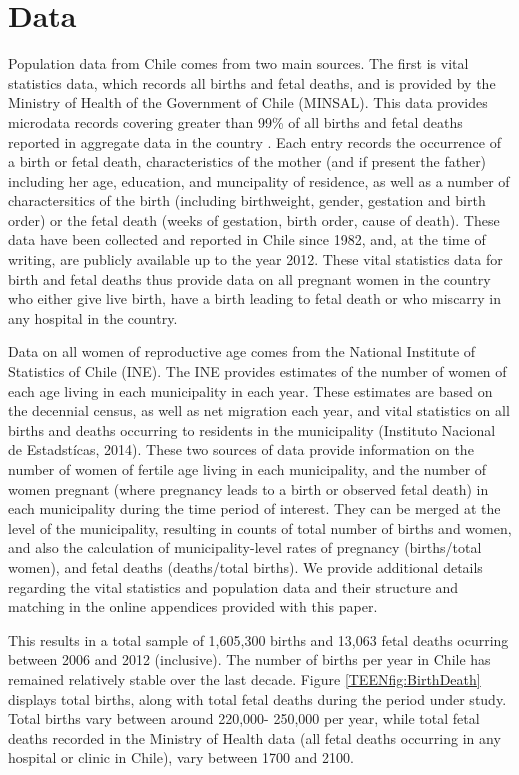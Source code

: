 \section{Data}
\label{TEENscn:Data}
Population data from Chile comes from two main sources. The first is vital 
statistics data, which records all births and fetal deaths, and is provided by 
the Ministry of Health of the Government of Chile (MINSAL). This data provides 
microdata records covering greater than 99\% of all births and fetal deaths 
reported in aggregate data in the country \citep{Bharadwajetal2013}. Each entry 
records the occurrence of a birth or fetal death, characteristics of the mother 
(and if present the father) including her age, education, and muncipality of 
residence, as well as a number of charactersitics of the birth (including 
birthweight, gender, gestation and birth order) or the fetal death (weeks of 
gestation, birth order, cause of death). These data have been collected and 
reported in Chile since 1982, and, at the time of writing, are publicly 
available up to the year 2012. These vital statistics data for birth and
fetal deaths thus provide data on all pregnant women in the country who either 
give live birth, have a birth leading to fetal death or who miscarry in any 
hospital in the country.

Data on all women of reproductive age comes from the National Institute of 
Statistics of Chile (INE). The INE provides estimates of the number of women 
of each age living in each municipality in each year. These estimates are based 
on the decennial census, as well as net migration each year, and vital 
statistics on all births and deaths occurring to residents in the municipality 
(Instituto Nacional de Estadst\'icas, 2014). These two sources of data provide 
information on the number of women of fertile age living in each municipality, 
and the number of women pregnant (where pregnancy leads to a birth or observed
fetal death) in each municipality during the time period of interest. They can
be merged at the level of the municipality, resulting in counts of total number
of births and women, and also the calculation of municipality-level rates of
pregnancy (births/total women), and fetal deaths (deaths/total births).  We
provide additional details regarding the vital statistics and population data
and their structure and matching in the online appendices provided with this
paper.

This results in a total sample of 1,605,300 births and 13,063 fetal deaths
ocurring between 2006 and 2012 (inclusive).  The number of births per year in 
Chile has remained relatively stable over the last decade.  Figure
\ref{TEENfig:BirthDeath} displays total births, along with total fetal deaths
during the period under study.  Total births vary between around 220,000-%
250,000 per year, while total fetal deaths recorded in the Ministry of Health
data (all fetal deaths occurring in any hospital or clinic in Chile), vary
between 1700 and 2100.

